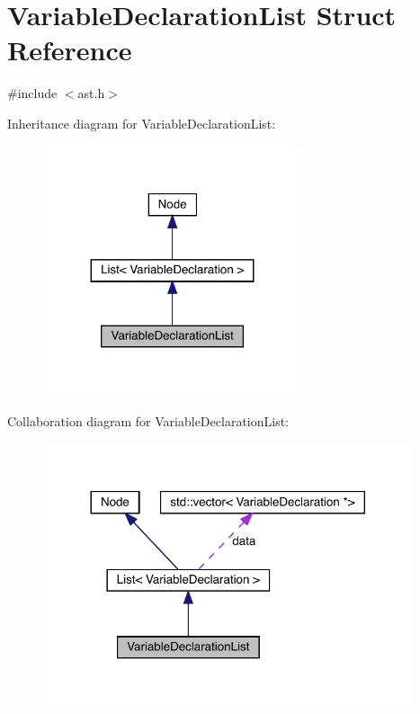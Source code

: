 \hypertarget{struct_variable_declaration_list}{}\section{Variable\+Declaration\+List Struct Reference}
\label{struct_variable_declaration_list}


{\ttfamily \#include $<$ast.\+h$>$}



Inheritance diagram for Variable\+Declaration\+List\+:\nopagebreak
\begin{figure}[H]
\begin{center}
\leavevmode
\includegraphics[width=215pt]{struct_variable_declaration_list__inherit__graph}
\end{center}
\end{figure}


Collaboration diagram for Variable\+Declaration\+List\+:\nopagebreak
\begin{figure}[H]
\begin{center}
\leavevmode
\includegraphics[width=308pt]{struct_variable_declaration_list__coll__graph}
\end{center}
\end{figure}
